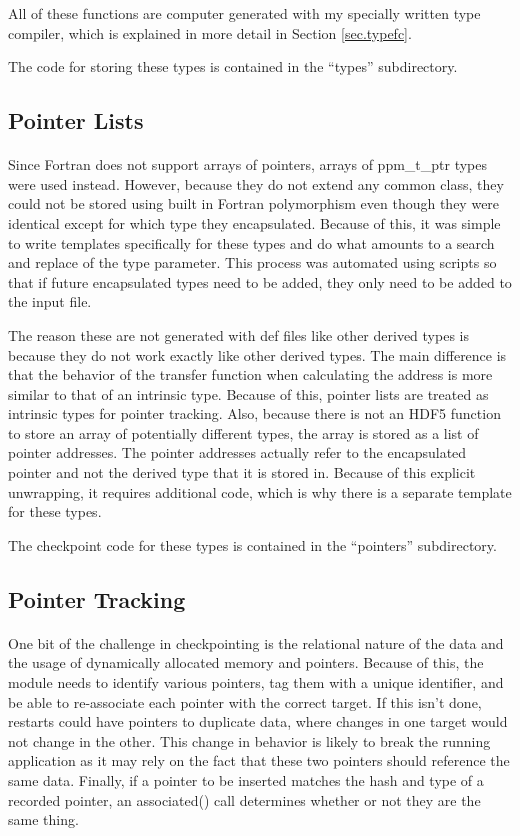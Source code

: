 \documentclass{article}
\begin{document}
All of these functions are computer generated with my specially written type compiler, which is explained in more detail in Section \ref{sec.typefc}.

The code for storing these types is contained in the ``types'' subdirectory.

\subsection{Pointer Lists}
\label{sec.ptrlists}
\paragraph{}
Since Fortran does not support arrays of pointers, arrays of ppm\_t\_ptr types were used instead. However, because they do not extend any common class, they could not be stored using built in Fortran polymorphism even though they were identical except for which type they encapsulated. Because of this, it was simple to write templates specifically for these types and do what amounts to a search and replace of the type parameter. This process was automated using scripts so that if future encapsulated types need to be added, they only need to be added to the input file.

The reason these are not generated with def files like other derived types is because they do not work exactly like other derived types. The main difference is that the behavior of the transfer function when calculating the address is more similar to that of an intrinsic type. Because of this, pointer lists are treated as intrinsic types for pointer tracking. Also, because there is not an HDF5 function to store an array of potentially different types, the array is stored as a list of pointer addresses. The pointer addresses actually refer to the encapsulated pointer and not the derived type that it is stored in. Because of this explicit unwrapping, it requires additional code, which is why there is a separate template for these types.

The checkpoint code for these types is contained in the ``pointers'' subdirectory.

\subsection{Pointer Tracking}
\label{sec.ptrtrack}
\paragraph{}
One bit of the challenge in checkpointing is the relational nature of the data and the usage of dynamically allocated memory and pointers. Because of this, the module needs to identify various pointers, tag them with a unique identifier, and be able to re-associate each pointer with the correct target. If this isn't done, restarts could have pointers to duplicate data, where changes in one target would not change in the other. This change in behavior is likely to break the running application as it may rely on the fact that these two pointers should reference the same data. Finally, if a pointer to be inserted matches the hash and type of a recorded pointer, an associated() call determines whether or not they are the same thing.
\end{document}
